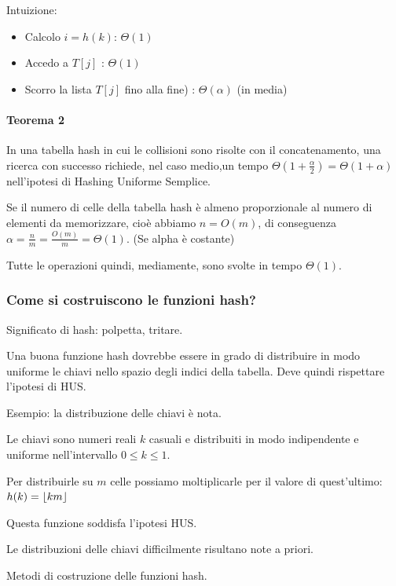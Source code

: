 \documentclass[tikz]{article}
\DeclarePairedDelimiter\floor{\lfloor}{\rfloor}
\providecommand{\tightlist}{%
  \setlength{\itemsep}{0pt}\setlength{\parskip}{0pt}}
\let\oldparagraph\paragraph
\renewcommand{\paragraph}[1]{\oldparagraph{#1}\mbox{}}
\begin{document}
{Intuizione:}

\begin{itemize}
\tightlist
\item
  {Calcolo $i=h(k)$: $\Theta(1)$}
\item
  {Accedo a $T[j]$ : $\Theta(1)$}
\item
  {Scorro la lista $T[j]$ fino alla fine) : $\Theta(\alpha)$ (in media)}
\end{itemize}

\paragraph{Teorema 2}

{In una tabella hash in cui le collisioni sono risolte con il concatenamento, una ricerca con successo richiede, nel caso medio,un tempo $\Theta(1+\frac{\alpha}{2}) = \Theta(1+\alpha)$ nell'ipotesi di Hashing Uniforme Semplice.}

{Se il numero di celle della tabella hash è almeno proporzionale al numero di elementi da memorizzare, cioè abbiamo $n=O(m)$, di conseguenza \\ $\alpha=\frac{n}{m} = \frac{O(m)}{m}=\Theta(1)$. (Se alpha è costante) }

Tutte le operazioni quindi, mediamente, sono svolte in tempo $\Theta(1)$.


\subsubsection{Come si costruiscono le funzioni hash?}

{Significato di hash: polpetta, tritare.}

{Una buona funzione hash dovrebbe essere in grado di distribuire in modo
uniforme le chiavi nello spazio degli indici della tabella. Deve quindi
rispettare l'ipotesi di HUS.}

{Esempio: la distribuzione delle chiavi è nota.}

{Le chiavi sono numeri reali $k$ casuali e distribuiti in modo indipendente e uniforme nell'intervallo $0 \leq k \leq 1$.}

{Per distribuirle su $m$ celle possiamo moltiplicarle per il valore di quest'ultimo: $h(k) = \floor{km}$}

{Questa funzione soddisfa l'ipotesi HUS.}

{Le distribuzioni delle chiavi difficilmente risultano note a priori. }

{Metodi di costruzione delle funzioni hash.}
\end{document}
